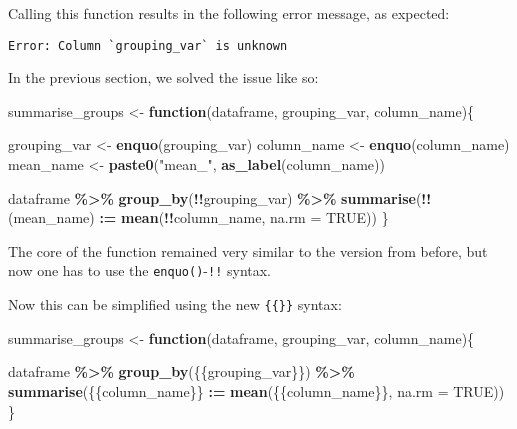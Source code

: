 \documentclass[
]{article}
\newenvironment{Shaded}{\begin{snugshade}}{\end{snugshade}}
\newcommand{\ControlFlowTok}[1]{\textcolor[rgb]{0.13,0.29,0.53}{\textbf{#1}}}
\newcommand{\DataTypeTok}[1]{\textcolor[rgb]{0.13,0.29,0.53}{#1}}
\newcommand{\ErrorTok}[1]{\textcolor[rgb]{0.64,0.00,0.00}{\textbf{#1}}}
\newcommand{\KeywordTok}[1]{\textcolor[rgb]{0.13,0.29,0.53}{\textbf{#1}}}
\newcommand{\NormalTok}[1]{#1}
\newcommand{\OperatorTok}[1]{\textcolor[rgb]{0.81,0.36,0.00}{\textbf{#1}}}
\newcommand{\OtherTok}[1]{\textcolor[rgb]{0.56,0.35,0.01}{#1}}
\newcommand{\StringTok}[1]{\textcolor[rgb]{0.31,0.60,0.02}{#1}}
\begin{document}
Calling this function results in the following error message, as expected:

\begin{verbatim}
Error: Column `grouping_var` is unknown
\end{verbatim}

In the previous section, we solved the issue like so:

\begin{Shaded}
\begin{Highlighting}[]
\NormalTok{summarise\_groups \textless{}{-}}\StringTok{ }\ControlFlowTok{function}\NormalTok{(dataframe, grouping\_var, column\_name)\{}

\NormalTok{  grouping\_var \textless{}{-}}\StringTok{ }\KeywordTok{enquo}\NormalTok{(grouping\_var)}
\NormalTok{  column\_name \textless{}{-}}\StringTok{ }\KeywordTok{enquo}\NormalTok{(column\_name)}
\NormalTok{  mean\_name \textless{}{-}}\StringTok{ }\KeywordTok{paste0}\NormalTok{(}\StringTok{"mean\_"}\NormalTok{, }\KeywordTok{as\_label}\NormalTok{(column\_name))}

\NormalTok{  dataframe }\OperatorTok{\%\textgreater{}\%}
\StringTok{    }\KeywordTok{group\_by}\NormalTok{(}\OperatorTok{!!}\NormalTok{grouping\_var) }\OperatorTok{\%\textgreater{}\%}\StringTok{  }
\StringTok{    }\KeywordTok{summarise}\NormalTok{(}\OperatorTok{!!}\NormalTok{(mean\_name) }\OperatorTok{:}\ErrorTok{=}\StringTok{ }\KeywordTok{mean}\NormalTok{(}\OperatorTok{!!}\NormalTok{column\_name, }\DataTypeTok{na.rm =} \OtherTok{TRUE}\NormalTok{))}
\NormalTok{\}}
\end{Highlighting}
\end{Shaded}

The core of the function remained very similar to the version from before, but now one has to
use the \texttt{enquo()}-\texttt{!!} syntax.

Now this can be simplified using the new \texttt{\{\{\}\}} syntax:

\begin{Shaded}
\begin{Highlighting}[]
\NormalTok{summarise\_groups \textless{}{-}}\StringTok{ }\ControlFlowTok{function}\NormalTok{(dataframe, grouping\_var, column\_name)\{}

\NormalTok{  dataframe }\OperatorTok{\%\textgreater{}\%}
\StringTok{    }\KeywordTok{group\_by}\NormalTok{(\{\{grouping\_var\}\}) }\OperatorTok{\%\textgreater{}\%}\StringTok{  }
\StringTok{    }\KeywordTok{summarise}\NormalTok{(\{\{column\_name\}\} }\OperatorTok{:}\ErrorTok{=}\StringTok{ }\KeywordTok{mean}\NormalTok{(\{\{column\_name\}\}, }\DataTypeTok{na.rm =} \OtherTok{TRUE}\NormalTok{))}
\NormalTok{\}}
\end{Highlighting}
\end{Shaded}
\end{document}
